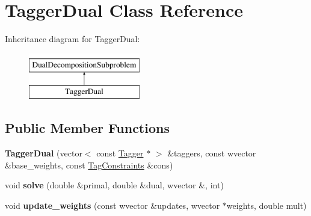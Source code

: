 \hypertarget{class_tagger_dual}{
\section{TaggerDual Class Reference}
\label{class_tagger_dual}
}
Inheritance diagram for TaggerDual:\begin{figure}[H]
\begin{center}
\leavevmode
\includegraphics[height=2cm]{class_tagger_dual}
\end{center}
\end{figure}
\subsection*{Public Member Functions}
\begin{DoxyCompactItemize}
\item 
\hypertarget{class_tagger_dual_a2b16f45c3550e4f4871841c9ee02de4f}{
{\bfseries TaggerDual} (vector$<$ const \hyperlink{class_tagger}{Tagger} $\ast$ $>$ \&taggers, const wvector \&base\_\-weights, const \hyperlink{class_tag_constraints}{TagConstraints} \&cons)}
\label{class_tagger_dual_a2b16f45c3550e4f4871841c9ee02de4f}

\item 
\hypertarget{class_tagger_dual_a047785058d058492172280e50a8f4c1a}{
void {\bfseries solve} (double \&primal, double \&dual, wvector \&, int)}
\label{class_tagger_dual_a047785058d058492172280e50a8f4c1a}

\item 
\hypertarget{class_tagger_dual_a01f7705a69c7cc993268c6e66df57ae0}{
void {\bfseries update\_\-weights} (const wvector \&updates, wvector $\ast$weights, double mult)}
\label{class_tagger_dual_a01f7705a69c7cc993268c6e66df57ae0}

\end{DoxyCompactItemize}
